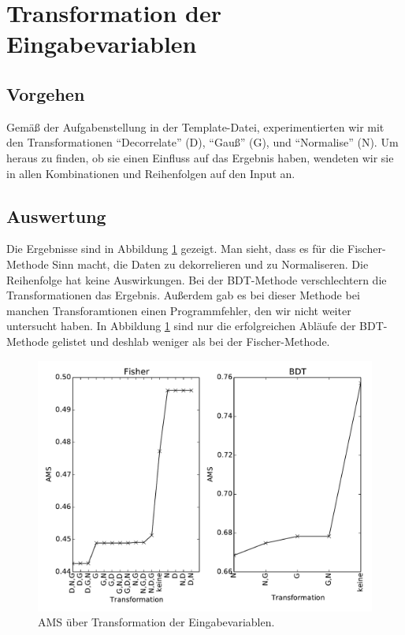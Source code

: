 \section{Transformation der Eingabevariablen}

\subsection{Vorgehen}
Gemäß der Aufgabenstellung in der Template-Datei, experimentierten wir mit den
Transformationen "`Decorrelate"' (D), "`Gauß"' (G), und "`Normalise"' (N).
Um heraus zu finden, ob sie einen Einfluss auf das Ergebnis haben, wendeten wir
sie in allen Kombinationen und Reihenfolgen auf den Input an.

\subsection{Auswertung}
Die Ergebnisse sind in Abbildung \ref{fig:ams_over_transforamtion} gezeigt. Man
sieht, dass es für die Fischer-Methode Sinn macht, die Daten zu dekorrelieren
und zu Normaliseren. Die Reihenfolge hat keine Auswirkungen. Bei der
BDT-Methode verschlechtern die Transformationen das Ergebnis. Außerdem gab es
bei dieser Methode bei manchen Transforamtionen einen Programmfehler, den wir
nicht weiter untersucht haben. In Abbildung \ref{fig:ams_over_transforamtion}
sind nur die erfolgreichen Abläufe der BDT-Methode gelistet und deshlab weniger
als bei der Fischer-Methode.





\begin{figure}[htp]
\begin{center}
  \includegraphics[width=\linewidth]{sections/input_transformations/var_transform_ranking.pdf}
  \caption[AMS über Transformation der Eingabevariablen]{AMS über Transformation der Eingabevariablen.}
  \label{fig:ams_over_transforamtion}
\end{center}
\end{figure}

